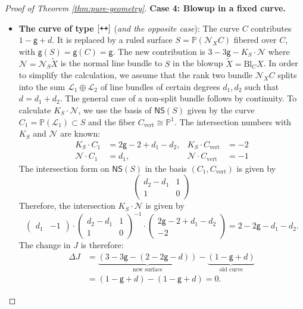 \documentclass[12pt,a4paper]{amsart}
\theoremstyle{definition}
\theoremstyle{remark}
\newcommand{\lp}{\textup{\texttt{+}}}
\begin{document}
\begin{proof}[Proof of Theorem \ref{thm:pure-geometry}]
\noindent \textbf{Case 4: Blowup in a fixed curve.}
\begin{itemize}
    \item \textbf{The curve of type $[\lp\lp]$} (\textit{and the opposite case}): The curve $C$ contributes $1 - \mathsf{g} + d$. It is replaced by a ruled surface $S = \mathbb{P}(\mathcal{N}_XC)$ fibered over $C$, with $\mathsf{g}(S) = \mathsf{g}(C) = \mathsf{g}$. The new contribution is $3 - 3\mathsf{g} - K_S \cdot \mathcal{N}$ where $\mathcal N=\mathcal N_S \widetilde X$ is the normal line bundle to $S$ in the blowup $\widetilde X=\mathrm{Bl}_C X$. In order to simplify the calculation, we assume that the rank two bundle $\mathcal N_X C$ splits into the sum $\mathcal L_1\oplus \mathcal L_2$ of line bundles of certain degrees $d_1,d_2$ such that $d=d_1+d_2$. The general case of a non-split bundle follows by continuity. To calculate $K_S \cdot \mathcal{N}$, we use the basis of $\mathsf{NS}(S)$ given by the curve $C_1 = \mathbb{P}(\mathcal{L}_1)\subset S$ and the fiber $C_{\text{vert}} \cong \mathbb{P}^1$. The intersection numbers with $K_S$ and $\mathcal{N}$ are known:
    \begin{align}
        K_S \cdot C_1 &= 2\mathsf{g}-2 + d_1-d_2,  & K_S \cdot C_{\text{vert}} &= -2 \\
        \mathcal{N} \cdot C_1 &= d_1, & \mathcal{N} \cdot C_{\text{vert}} &= -1
    \end{align}
    The intersection form on $\mathsf{NS}(S)$ in the basis $(C_1,C_{\mathrm{vert}})$ is given by
    $$\begin{pmatrix}d_2-d_1 & 1\\1& 0\end{pmatrix}$$
    Therefore, the intersection $K_S\cdot \mathcal N$ is given by
    $$ \begin{pmatrix}d_1  &-1\end{pmatrix} \cdot \begin{pmatrix}d_2-d_1 & 1\\1& 0\end{pmatrix}^{-1}\cdot  \begin{pmatrix}2\mathsf{g}-2+d_1-d_2\\-2\end{pmatrix} =2-2\mathsf{g}-d_1-d_2.  $$
    The change in $J$ is therefore:
    \begin{align}
       \Delta J &=\underbrace{ (3 - 3\mathsf{g} - (2 - 2\mathsf{g} - d))}_{\text{new surface}} - \underbrace{(1 - \mathsf{g} + d)}_{\text{old curve}} \\
        &= (1 - \mathsf{g} + d) - (1 - \mathsf{g} + d) = 0.
    \end{align}


\end{itemize}
\end{proof}
\end{document}
